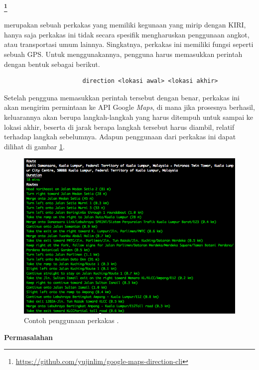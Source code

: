 \documentclass[a4paper,twoside]{article}
\begin{document}
\begin{enumerate}
\large{\textbf{\googlemapscli\footnote{\href{https://github.com/yujinlim/google-maps-direction-cli}{https://github.com/yujinlim/google-maps-direction-cli}}}}
\label{sec:similarapps-googlemapscli}

\googlemapscli merupakan sebuah perkakas \cl yang memiliki kegunaan yang mirip dengan KIRI, hanya saja perkakas ini tidak secara spesifik mengharuskan penggunaan angkot, atau transportasi umum lainnya. Singkatnya, perkakas ini memiliki fungsi seperti sebuah GPS. Untuk menggunakannya, pengguna harus memasukkan perintah dengan bentuk sebagai berikut.

\begin{verbatim}
                      direction <lokasi awal> <lokasi akhir>
\end{verbatim}

Setelah pengguna memasukkan perintah tersebut dengan benar, perkakas ini akan mengirim permintaan ke API Google \textit{Maps}, di mana jika prosesnya berhasil, keluarannya akan berupa langkah-langkah yang harus ditempuh untuk sampai ke lokasi akhir, beserta di jarak berapa langkah tersebut harus diambil, relatif terhadap langkah sebelumnya. Adapun penggunaan dari perkakas ini dapat dilihat di gambar \ref{fig:similarapps-googlemapscli}.

\begin{figure}[ht]
    \centering
    \includegraphics[width=0.66667\linewidth]{googlemapscli}
    \caption[Contoh penggunaan perkakas \googlemapscli]{Contoh penggunaan perkakas \googlemapscli.\protect\footnotemark}
    \label{fig:similarapps-googlemapscli}
\end{figure}

\textbf{Permasalahan}
\label{sec:similarapps-googlemapscli-problem}


\end{enumerate}
\end{document}
